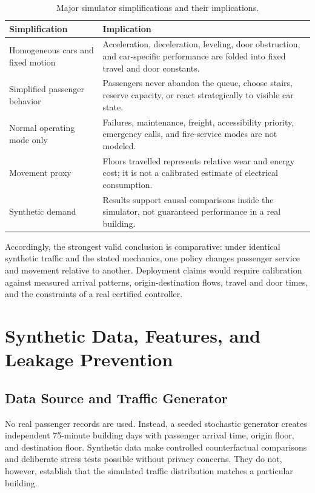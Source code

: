 \documentclass[12pt]{article}
\begin{document}
\begin{table}[htbp]
  \centering
  \caption{Major simulator simplifications and their implications.}
  \label{tab:simulator-limitations}
  \begin{tabular}{@{}>{\raggedright\arraybackslash}p{}
    >{\raggedright\arraybackslash}p{}@{}}
    \toprule
    Simplification & Implication \\
    \midrule
    Homogeneous cars and fixed motion & Acceleration, deceleration, leveling,
      door obstruction, and car-specific performance are folded into fixed
      travel and door constants. \\
    Simplified passenger behavior & Passengers never abandon the queue, choose
      stairs, reserve capacity, or react strategically to visible car state. \\
    Normal operating mode only & Failures, maintenance, freight, accessibility
      priority, emergency calls, and fire-service modes are not modeled. \\
    Movement proxy & Floors travelled represents relative wear and energy cost;
      it is not a calibrated estimate of electrical consumption. \\
    Synthetic demand & Results support causal comparisons inside the simulator,
      not guaranteed performance in a real building. \\
    \bottomrule
  \end{tabular}
\end{table}

Accordingly, the strongest valid conclusion is comparative: under identical
synthetic traffic and the stated mechanics, one policy changes passenger
service and movement relative to another. Deployment claims would require
calibration against measured arrival patterns, origin-destination flows,
travel and door times, and the constraints of a real certified controller.

\section{Synthetic Data, Features, and Leakage Prevention}
\label{sec:data-pipeline}

\subsection{Data Source and Traffic Generator}

No real passenger records are used. Instead, a seeded stochastic generator
creates independent 75-minute building days with passenger arrival time,
origin floor, and destination floor. Synthetic data make controlled
counterfactual comparisons and deliberate stress tests possible without
privacy concerns. They do not, however, establish that the simulated traffic
distribution matches a particular building.
\end{document}
